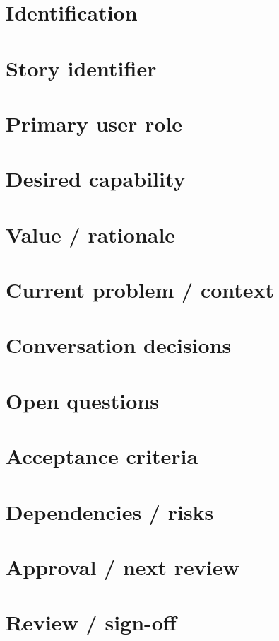 \documentclass[11pt,letterpaper]{article}
\begin{document}
\section{Identification}
\section{Story identifier}
\section{Primary user role}
\section{Desired capability}
\section{Value / rationale}
\section{Current problem / context}
\clearpage
\section{Conversation decisions}
\section{Open questions}
\section{Acceptance criteria}
\section{Dependencies / risks}
\clearpage
\section{Approval / next review}
\section{Review / sign-off}
\end{document}

